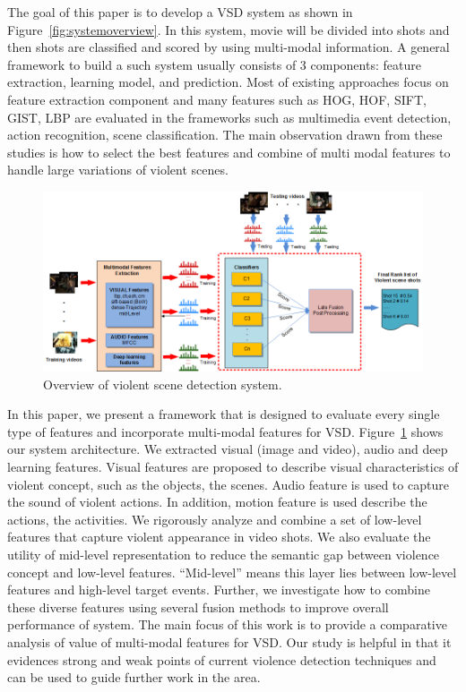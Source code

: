 \documentclass[review]{elsarticle}
\begin{document}
The goal of this paper is to develop a VSD system as shown in Figure~\ref{fig:systemoverview}. In this system, movie will be divided into shots and then shots are classified and scored by using multi-modal information. A general framework to build a such system usually consists of 3 components: feature extraction, learning model, and prediction. Most of existing approaches focus on feature extraction component and many features such as HOG, HOF, SIFT, GIST, LBP are evaluated in the frameworks such as multimedia event detection, action recognition, scene classification. The main observation drawn from these studies is how to select the best features and combine of multi modal features to handle large variations of violent scenes. 
\begin{figure}[!t]
	\centering
	\includegraphics[width=1\linewidth]{Images/Framework1.png}
	\caption{Overview of violent scene detection system.}
	\label{fig:framework}
\end{figure}

In this paper, we present a framework that is designed to evaluate every single type of features and incorporate multi-modal features for VSD. Figure~\ref{fig:framework} shows our system architecture.  We extracted visual (image and video), audio and deep learning features. Visual features are proposed to describe visual characteristics of violent concept, such as the objects, the scenes. Audio feature is used to capture the sound of violent actions. In addition, motion feature is used describe the actions, the activities. We rigorously analyze and combine a set of low-level features that capture violent appearance in video shots. We also evaluate the utility of mid-level representation to reduce the semantic gap between violence concept and low-level features. “Mid-level” means this layer lies between low-level features and high-level target events. Further, we investigate how to combine these diverse features using several fusion methods to improve overall performance of system. The main focus of this work is to provide a comparative analysis of value of multi-modal features for VSD. Our study is helpful in that it evidences strong and weak points of current violence detection techniques and can be used to guide further work in the area.
\end{document}
